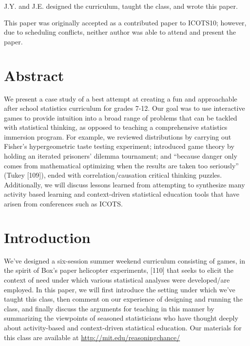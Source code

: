 \documentclass[12pt,twoside]{mitthesis-manusdown}
\begin{document}
\noindent J.Y. and J.E. designed the curriculum, taught the class, and
wrote this paper. \newline

\noindent This paper was originally accepted as a contributed paper to
ICOTS10; however, due to scheduling conflicts, neither author was able
to attend and present the paper.

\doublespace
\newpage

\section{Abstract}\label{abstract-3}

We present a case study of a best attempt at creating a fun and
approachable after school statistics curriculum for grades 7-12. Our
goal was to use interactive games to provide intuition into a broad
range of problems that can be tackled with statistical thinking, as
opposed to teaching a comprehensive statistics immersion program. For
example, we reviewed distributions by carrying out Fisher's
hypergeometric taste testing experiment; introduced game theory by
holding an iterated prisoners' dilemma tournament; and ``because danger
only comes from mathematical optimizing when the results are taken too
seriously'' (Tukey {[}109{]}), ended with correlation/causation critical
thinking puzzles. Additionally, we will discuss lessons learned from
attempting to synthesize many activity based learning and context-driven
statistical education tools that have arisen from conferences such as
ICOTS.

\section{Introduction}\label{introduction-3}

We've designed a six-session summer weekend curriculum consisting of
games, in the spirit of Box's paper helicopter experiments, {[}110{]}
that seeks to elicit the context of need under which various statistical
analyses were developed/are employed. In this paper, we will first
introduce the setting under which we've taught this class, then comment
on our experience of designing and running the class, and finally
discuss the arguments for teaching in this manner by summarizing the
viewpoints of seasoned statisticians who have thought deeply about
activity-based and context-driven statistical education. Our materials
for this class are available at \url{http://mit.edu/reasoningchance/}
\end{document}
